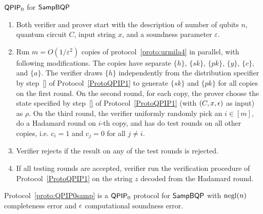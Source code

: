 \begin{protocol}{$\operatorname{\mathsf{QPIP}}_0$ for $\operatorname{\mathsf{SampBQP}}$}
\label{proto:QPIP0samp}
\begin{enumerate}
    \item Both verifier and prover start with the description of number of qubits $n$, quantum circuit $C$, input string $x$, and  a soundness parameter $\varepsilon$.
    \item Run $m=O(1/\varepsilon^2)$ copies of protocol~\ref{proto:urmila4} in parallel, with following modifications. The copies have separate $\{h\}$, $\{sk\}$, $\{pk\}$, $\{y\}$, $\{c\}$, and $\{a\}$.  The verifier draws $\{h\}$ independently from the distribution specifier by step~\ref{} of Protocol~\ref{ProtoQPIP1} to generate $\{sk\}$ and $\{pk\}$ for all copies on the first round. On the second round, for each copy, the prover choose the state specified by step~\ref{} of Protocol~\ref{ProtoQPIP1}  (with  $(C,x,\epsilon)$ as input) as $\rho$. On the third round, the verifier uniformly randomly pick an $i\in [m]$, do a Hadamard round on $i$-th copy, and has do test rounds on all other copies, i.e. $c_i=1$ and $c_j=0$ for all $j\neq i$.
    \item \label{step:multi-testing}Verifier rejects if the result on any of the test rounds is rejected. 
    \item If all testing rounds are accepted, verifier run the verification procedure of Protocol~\ref{ProtoQPIP1} on the string $z$ decoded from the Hadamard round.
\end{enumerate}
\end{protocol}

\begin{theorem}\label{thm:qpip0}
    Protocol~\ref{proto:QPIP0samp} is a $\operatorname{\mathsf{QPIP}}_0$ protocol for $\operatorname{\mathsf{SampBQP}}$ with $\operatorname{negl}(n)$ completeness error and $\epsilon$ computational soundness error. 
\end{theorem}







